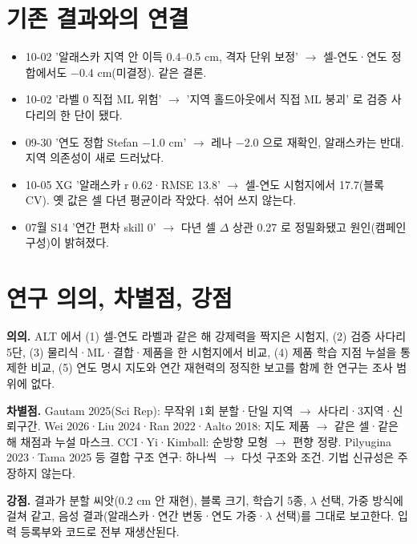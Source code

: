 \documentclass[10pt]{article}
\begin{document}
\section{기존 결과와의 연결}
\begin{itemize}[leftmargin=1.2em,itemsep=0.1em]
\item 10-02 '알래스카 지역 안 이득 0.4--0.5 cm, 격자 단위 보정' $\to$ 셀-연도·연도 정합에서도 $-$0.4 cm(미결정). 같은 결론.
\item 10-02 '라벨 0 직접 ML 위험' $\to$ '지역 홀드아웃에서 직접 ML 붕괴' 로 검증 사다리의 한 단이 됐다.
\item 09-30 '연도 정합 Stefan $-$1.0 cm' $\to$ 레나 $-$2.0 으로 재확인, 알래스카는 반대. 지역 의존성이 새로 드러났다.
\item 10-05 XG '알래스카 r 0.62·RMSE 13.8' $\to$ 셀-연도 시험지에서 17.7(블록 CV). 옛 값은 셀 다년 평균이라 작았다. 섞어 쓰지 않는다.
\item 07월 S14 '연간 편차 skill 0' $\to$ 다년 셀 $\Delta$ 상관 0.27 로 정밀화됐고 원인(캠페인 구성)이 밝혀졌다.
\end{itemize}

\section{연구 의의, 차별점, 강점}
\textbf{의의.} ALT 에서 (1) 셀-연도 라벨과 같은 해 강제력을 짝지은 시험지, (2) 검증 사다리 5단, (3) 물리식·ML·결합·제품을 한 시험지에서 비교, (4) 제품 학습 지점 누설을 통제한 비교, (5) 연도 명시 지도와 연간 재현력의 정직한 보고를 함께 한 연구는 조사 범위에 없다.

\textbf{차별점.} Gautam 2025(Sci Rep): 무작위 1회 분할·단일 지역 $\to$ 사다리·3지역·신뢰구간. Wei 2026·Liu 2024·Ran 2022·Aalto 2018: 지도 제품 $\to$ 같은 셀·같은 해 채점과 누설 마스크. CCI·Yi·Kimball: 순방향 모형 $\to$ 편향 정량. Pilyugina 2023·Tama 2025 등 결합 구조 연구: 하나씩 $\to$ 다섯 구조와 조건. 기법 신규성은 주장하지 않는다.

\textbf{강점.} 결과가 분할 씨앗(0.2 cm 안 재현), 블록 크기, 학습기 5종, $\lambda$ 선택, 가중 방식에 걸쳐 같고, 음성 결과(알래스카·연간 변동·연도 가중·$\lambda$ 선택)를 그대로 보고한다. 입력 등록부와 코드로 전부 재생산된다.
\end{document}
